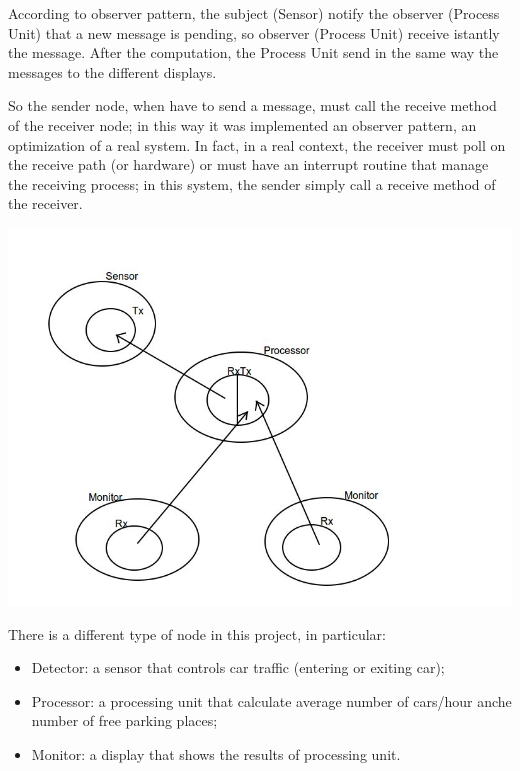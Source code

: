 \documentclass[a4paper,titlepage]{article}
\begin{document}
According to observer pattern, the subject (Sensor) notify the observer (Process Unit) that a new message is pending, so observer (Process Unit) receive istantly the message. After the computation, the Process Unit send in the same way the messages to the different displays.

So the sender node, when have to send a message, must call the receive method of the receiver node; in this way it was implemented an observer pattern, an optimization of a real system. In fact, in a real context, the receiver must poll on the receive path (or hardware) or must have an interrupt routine that manage the receiving process; in this system, the sender simply call a receive method of the receiver. 

    \begin{center}

    \centering
    \includegraphics[scale=0.40]{pattern.jpg}

    \end{center}


There is a different type of node in this project, in particular:

\begin{itemize}[noitemsep,topsep=20pt,parsep=10pt,partopsep=20pt]

\item Detector: a sensor that controls car traffic (entering or exiting car); 
\item Processor: a processing unit that calculate average number of cars/hour anche number of free parking places;
\item Monitor: a display that shows the results of processing unit.

\end{itemize}
\end{document}
